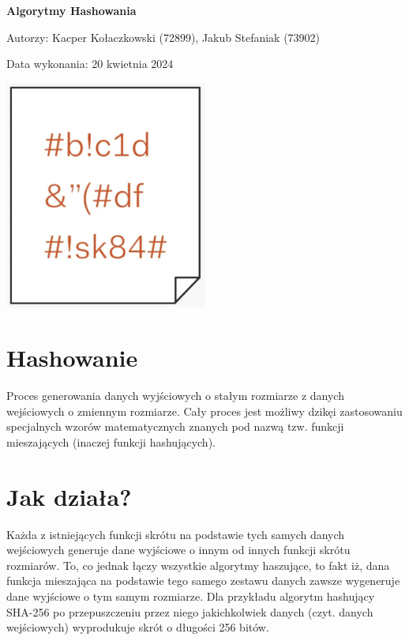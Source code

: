 \documentclass[12pt, letterpaper]{article}
\begin{document}
\renewcommand*\contentsname{Spis treści}
\begin{titlepage}
    \centering 
    
    \Huge 
    \textbf{Algorytmy Hashowania} 
    \vspace{1.5cm} %
    
    \Large 
    Autorzy: Kacper Kołaczkowski (72899), Jakub Stefaniak (73902)
    \vspace{1cm} 
    
    Data wykonania: 20 kwietnia 2024 
    \vspace{2cm} 
    
    \includegraphics[width=0.5\textwidth]{hash.png} %
\end{titlepage}
\newpage
\tableofcontents
\newpage

\section{Hashowanie}
Proces generowania danych wyjściowych o stałym rozmiarze z danych wejściowych o zmiennym rozmiarze. Cały proces jest możliwy dzikęi zastosowaniu specjalnych wzorów matematycznych znanych pod nazwą tzw. funkcji mieszających (inaczej funkcji hashujących).

\section{Jak działa?}
Każda z istniejących funkcji skrótu na podstawie tych samych danych wejściowych generuje dane wyjściowe o innym od innych funkcji skrótu rozmiarów. To, co jednak łączy wszystkie algorytmy haszujące, to fakt iż, dana funkcja mieszająca na podstawie tego samego zestawu danych zawsze wygeneruje dane wyjściowe o tym samym rozmiarze. Dla przykładu algorytm hashujący SHA-256 po przepuszczeniu przez niego jakichkolwiek danych (czyt. danych wejściowych) wyprodukuje skrót o długości 256 bitów.
\end{document}
